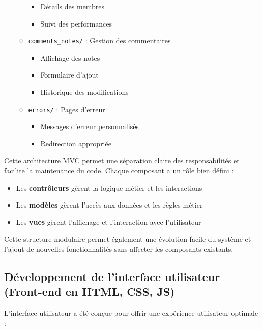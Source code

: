 \documentclass[12pt,a4paper]{article}
\begin{document}
\begin{itemize}
\begin{itemize}
\begin{itemize}
            \item Détails des membres
            \item Suivi des performances
        \end{itemize}
        \item \texttt{comments\_notes/} : Gestion des commentaires
        \begin{itemize}
            \item Affichage des notes
            \item Formulaire d'ajout
            \item Historique des modifications
        \end{itemize}
        \item \texttt{errors/} : Pages d'erreur
        \begin{itemize}
            \item Messages d'erreur personnalisés
            \item Redirection appropriée
        \end{itemize}
    \end{itemize}
\end{itemize}

Cette architecture MVC permet une séparation claire des responsabilités et facilite la maintenance du code. Chaque composant a un rôle bien défini :
\begin{itemize}
    \item Les \textbf{contrôleurs} gèrent la logique métier et les interactions
    \item Les \textbf{modèles} gèrent l'accès aux données et les règles métier
    \item Les \textbf{vues} gèrent l'affichage et l'interaction avec l'utilisateur
\end{itemize}

Cette structure modulaire permet également une évolution facile du système et l'ajout de nouvelles fonctionnalités sans affecter les composants existants.

\subsection{Développement de l'interface utilisateur (Front-end en HTML, CSS, JS)}
L'interface utilisateur a été conçue pour offrir une expérience utilisateur optimale :
\end{document}
